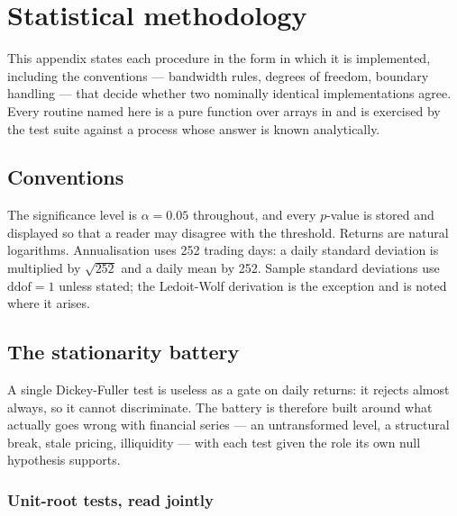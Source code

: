 \appendix
\newpage

\section{Statistical methodology}
\label{app:method}

This appendix states each procedure in the form in which it is implemented, including
the conventions --- bandwidth rules, degrees of freedom, boundary handling --- that
decide whether two nominally identical implementations agree. Every routine named
here is a pure function over arrays in  and is exercised by the
test suite against a process whose answer is known analytically.

\subsection{Conventions}

The significance level is $\alpha = 0.05$ throughout, and every $p$-value is stored
and displayed so that a reader may disagree with the threshold. Returns are natural
logarithms. Annualisation uses 252 trading days: a daily standard deviation is
multiplied by $\sqrt{252}$ and a daily mean by 252. Sample standard deviations use
$\mathrm{ddof}=1$ unless stated; the Ledoit-Wolf derivation is the exception and is
noted where it arises.

\subsection{The stationarity battery}
\label{app:stationarity}

A single Dickey-Fuller test is useless as a gate on daily returns: it rejects almost
always, so it cannot discriminate. The battery is therefore built around what
actually goes wrong with financial series --- an untransformed level, a structural
break, stale pricing, illiquidity --- with each test given the role its own null
hypothesis supports.

\subsubsection{Unit-root tests, read jointly}

